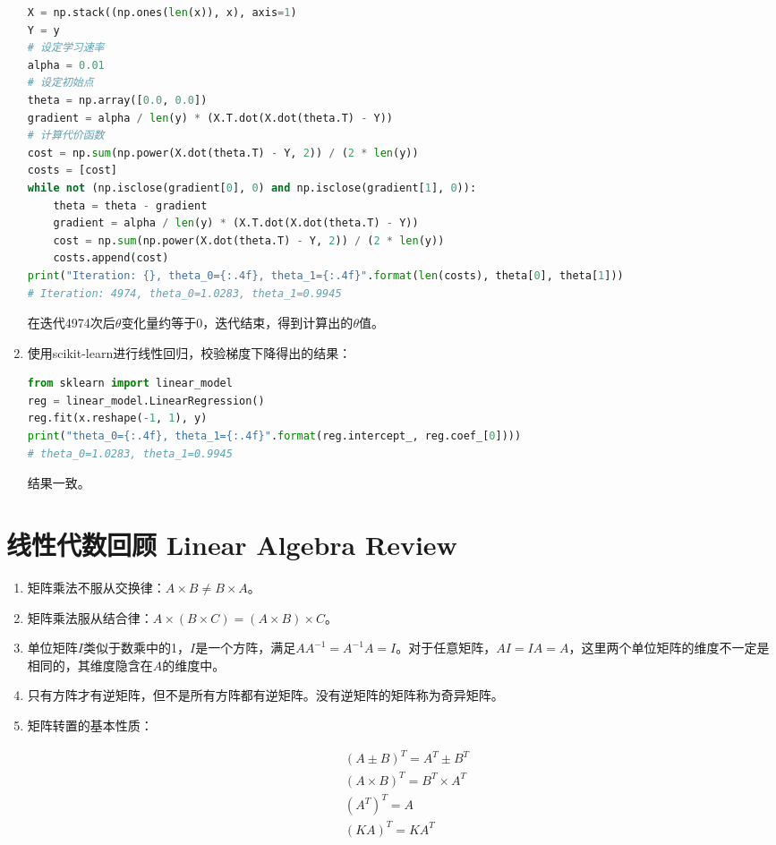 \documentclass[12pt, a4paper]{article}
\begin{document}
\begin{enumerate}
          \begin{lstlisting}[language=Python]
X = np.stack((np.ones(len(x)), x), axis=1)
Y = y
# 设定学习速率
alpha = 0.01
# 设定初始点
theta = np.array([0.0, 0.0])
gradient = alpha / len(y) * (X.T.dot(X.dot(theta.T) - Y))
# 计算代价函数
cost = np.sum(np.power(X.dot(theta.T) - Y, 2)) / (2 * len(y))
costs = [cost]
while not (np.isclose(gradient[0], 0) and np.isclose(gradient[1], 0)):
    theta = theta - gradient
    gradient = alpha / len(y) * (X.T.dot(X.dot(theta.T) - Y))
    cost = np.sum(np.power(X.dot(theta.T) - Y, 2)) / (2 * len(y))
    costs.append(cost)
print("Iteration: {}, theta_0={:.4f}, theta_1={:.4f}".format(len(costs), theta[0], theta[1]))
# Iteration: 4974, theta_0=1.0283, theta_1=0.9945
               \end{lstlisting}

          在迭代4974次后$\theta$变化量约等于0，迭代结束，得到计算出的$\theta$值。

    \item
          使用scikit-learn进行线性回归，校验梯度下降得出的结果：

          \begin{lstlisting}[language=Python]
from sklearn import linear_model
reg = linear_model.LinearRegression()
reg.fit(x.reshape(-1, 1), y)
print("theta_0={:.4f}, theta_1={:.4f}".format(reg.intercept_, reg.coef_[0])))
# theta_0=1.0283, theta_1=0.9945
               \end{lstlisting}

          结果一致。
\end{enumerate}

\section{线性代数回顾 Linear Algebra Review}

\begin{enumerate}
    \item
          矩阵乘法不服从交换律：$A\times B\neq B\times A$。
    \item
          矩阵乘法服从结合律：$A\times(B\times C) = (A\times B)\times C$。
    \item
          单位矩阵$I$类似于数乘中的1，$I$是一个方阵，满足$AA^{-1}=A^{-1}A=I$。对于任意矩阵，$AI=IA=A$，这里两个单位矩阵的维度不一定是相同的，其维度隐含在$A$的维度中。
    \item
          只有方阵才有逆矩阵，但不是所有方阵都有逆矩阵。没有逆矩阵的矩阵称为奇异矩阵。
    \item
          矩阵转置的基本性质：

          \begin{align*}
               & (A\pm B)^T = A^T\pm B^T       \\
               & (A\times B)^T = B^T\times A^T \\
               & (A^T)^T = A                   \\
               & (KA)^T = KA^T
          \end{align*}
\end{enumerate}
\end{document}
